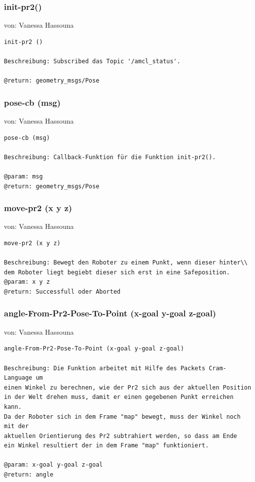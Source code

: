 \documentclass{suturo}
\makeatletter
\newcommand{\chapterauthor}[1]{%
  {\parindent0pt\vspace*{-27pt}%
  \linespread{0}\small\begin{flushright}von: #1\end{flushright}%
  \par\nobreak\vspace*{0pt}}
  \@afterheading%
}
\makeatother
\begin{document}
\subsubsection{init-pr2()}
\chapterauthor{Vanessa Hassouna}
\begin{verbatim}
init-pr2 ()

Beschreibung: Subscribed das Topic '/amcl_status'.

@return: geometry_msgs/Pose
\end{verbatim}

\subsubsection{pose-cb (msg)}
\chapterauthor{Vanessa Hassouna}
\begin{verbatim}
pose-cb (msg)

Beschreibung: Callback-Funktion für die Funktion init-pr2().

@param: msg
@return: geometry_msgs/Pose
\end{verbatim}

\subsubsection{move-pr2 (x y z)}
\chapterauthor{Vanessa Hassouna}
\begin{verbatim}
move-pr2 (x y z)

Beschreibung: Bewegt den Roboter zu einem Punkt, wenn dieser hinter\\
dem Roboter liegt begiebt dieser sich erst in eine Safeposition.
@param: x y z 
@return: Successfull oder Aborted
\end{verbatim}

\subsubsection{angle-From-Pr2-Pose-To-Point (x-goal y-goal z-goal)}
\chapterauthor{Vanessa Hassouna}
\begin{verbatim}
angle-From-Pr2-Pose-To-Point (x-goal y-goal z-goal)

Beschreibung: Die Funktion arbeitet mit Hilfe des Packets Cram-Language um 
einen Winkel zu berechnen, wie der Pr2 sich aus der aktuellen Position 
in der Welt drehen muss, damit er einen gegebenen Punkt erreichen kann.
Da der Roboter sich in dem Frame "map" bewegt, muss der Winkel noch mit der 
aktuellen Orientierung des Pr2 subtrahiert werden, so dass am Ende
ein Winkel resultiert der in dem Frame "map" funktioniert.

@param: x-goal y-goal z-goal 
@return: angle 
\end{verbatim}
\end{document}
